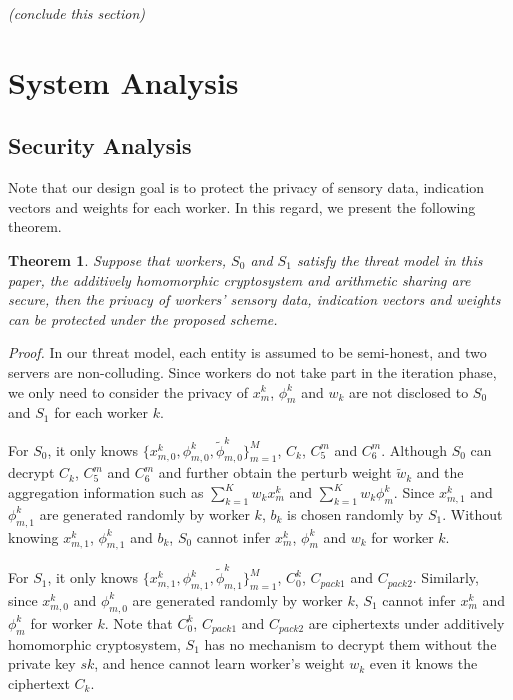 \documentclass[conference]{IEEEtran}
\newtheorem{theorem}{Theorem}[section]
\begin{document}
{\em (conclude this section)}

\section{System Analysis}\label{sec6}

\subsection{Security Analysis}
Note that our design goal is to protect the privacy of sensory data, indication vectors and weights for each worker.
In this regard, we present the following theorem.

\begin{theorem}
  Suppose that workers, $S_0$ and $S_1$ satisfy the threat model in this paper, the additively homomorphic cryptosystem and arithmetic sharing are secure, then the privacy of workers' sensory data, indication vectors and weights can be protected under the proposed scheme.
\end{theorem}

{\noindent\em Proof.} In our threat model, each entity is assumed to be semi-honest, and two servers are non-colluding.
Since workers do not take part in the iteration phase, we only need to consider the privacy of $x_m^k$, $\phi_m^k$ and $w_k$ are not disclosed to $S_0$ and $S_1$ for each worker $k$.

For $S_0$, it only knows $\{x_{m,0}^k, \phi_{m,0}^k, \tilde{\phi}_{m,0}^k\}_{m=1}^M$, $C_k$, $C_5^m$ and $C_6^m$.
Although $S_0$ can decrypt $C_k$, $C_5^m$ and $C_6^m$ and further obtain the perturb weight $\tilde{w}_k$ and the aggregation information such as $\sum_{k=1}^K w_k x_m^k$ and $\sum_{k=1}^K w_k \phi_m^k$.
Since $x_{m,1}^k$ and $\phi_{m,1}^k$ are generated randomly by worker $k$, $b_k$ is chosen randomly by $S_1$.
Without knowing $x_{m,1}^k$, $\phi_{m,1}^k$ and $b_k$, $S_0$ cannot infer $x_m^k$, $\phi_m^k$ and $w_k$ for worker $k$.

For $S_1$, it only knows $\{x_{m,1}^k, \phi_{m,1}^k, \tilde{\phi}_{m,1}^k\}_{m=1}^M$, $C_0^k$, $C_{pack1}$ and $C_{pack2}$.
Similarly, since $x_{m,0}^k$ and $\phi_{m,0}^k$ are generated randomly by worker $k$, $S_1$ cannot infer $x_m^k$ and $\phi_m^k$ for worker $k$.
Note that $C_0^k$, $C_{pack1}$ and $C_{pack2}$ are ciphertexts under additively homomorphic cryptosystem, $S_1$ has no mechanism to decrypt them without the private key $sk$, and hence cannot learn worker's weight $w_k$ even it knows the ciphertext $C_k$.
\end{document}
